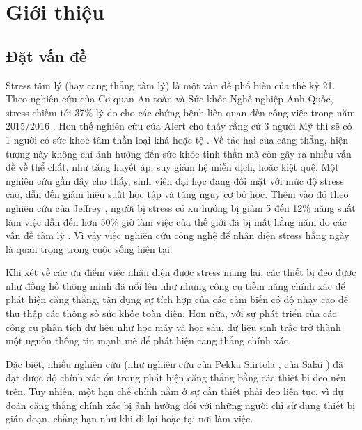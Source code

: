 \chapter{Giới thiệu}
\section{Đặt vấn đề}\label{Problems_settings}
Stress tâm lý (hay căng thẳng tâm lý) là một vấn đề phổ biến của thế kỷ 21. Theo nghiên cứu của Cơ quan An toàn và Sức khỏe Nghề nghiệp Anh Quốc, stress chiếm tới 37\% lý do cho các chứng bệnh liên quan đến công việc trong năm 2015/2016
\cite{HSE}. Hơn thế nghiên cứu của Alert cho thấy rằng cứ 3 người Mỹ thì sẽ có 1 người có sức khoẻ tâm thần loại khá hoặc tệ \cite{american_stress}. Về tác hại của căng thẳng, hiện tượng này không chỉ ảnh hưởng đến sức khỏe tinh thần mà còn gây ra nhiều vấn đề về thể chất, như tăng huyết áp, suy giảm hệ miễn dịch, hoặc kiệt quệ. Một nghiên cứu gần đây cho thấy, sinh viên đại học đang đối mặt với mức độ stress cao, dẫn đến giảm hiệu suất học tập và tăng nguy cơ bỏ học. Thêm vào đó theo nghiên cứu của Jeffrey \cite{stress_reduce_productivity}, người bị stress có xu hướng bị giảm 5 đến 12\% năng suất làm việc dẫn đến hơn 50\% giờ làm việc của thế giới đã bị mất hằng năm do các vấn đề tâm lý \cite{workday_lost}. Vì vậy việc nghiên cứu công nghệ để nhận diện stress hằng ngày là quan trọng trong cuộc sống hiện tại.


Khi xét về các ưu điểm việc nhận diện được stress mang lại, các thiết bị đeo được như đồng hồ thông minh đã nổi lên như những công cụ tiềm năng chính xác để phát hiện căng thẳng, tận dụng sự tích hợp của các cảm biến có độ nhạy cao để thu thập các thông số sức khỏe toàn diện. Hơn nữa, với sự phát triển của các công cụ phân tích dữ liệu như học máy và học sâu, dữ liệu sinh trắc trở thành một nguồn thông tin mạnh mẽ để phát hiện căng thẳng chính xác.

Đặc biệt, nhiều nghiên cứu (như nghiên cứu của Pekka Siirtola \cite{PS}, của Salai \cite{stress_heartrate}) đã đạt được độ chính xác ổn trong phát hiện căng thẳng bằng các thiết bị đeo nêu trên. Tuy nhiên, một hạn chế chính nằm ở sự cần thiết phải đeo liên tục, vì dự đoán căng thẳng chính xác bị ảnh hưởng đối với những người chỉ sử dụng thiết bị gián đoạn, chẳng hạn như khi đi lại hoặc tại nơi làm việc.


